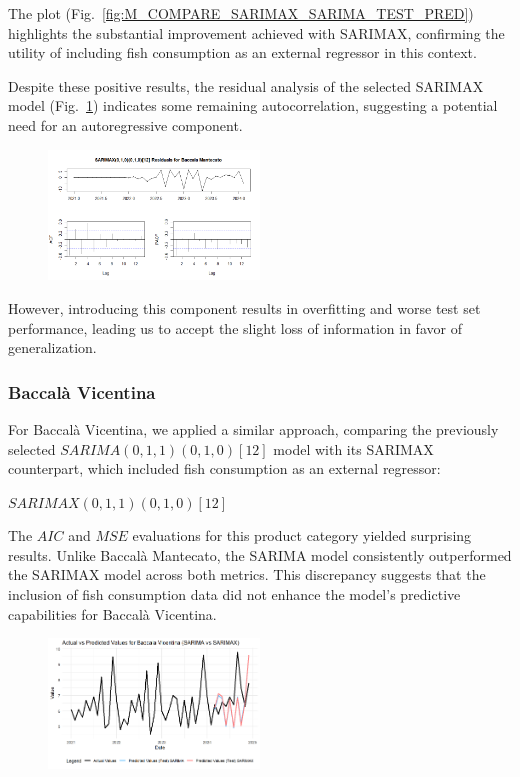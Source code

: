 \documentclass[10pt,twocolumn,letterpaper]{article}
\begin{document}
The plot (Fig.~\ref{fig:M_COMPARE_SARIMAX_SARIMA_TEST_PRED}) highlights the substantial improvement achieved with SARIMAX, confirming the utility of including fish consumption as an external regressor in this context.

Despite these positive results, the residual analysis of the selected SARIMAX model (Fig.~\ref{fig:ACF_SARIMAX_M}) indicates some remaining autocorrelation, suggesting a potential need for an autoregressive component. 
\begin{figure}[H]
    \centering
    \includegraphics[width=0.5\textwidth]{PlotsBEFD/ACF_SARIMAX_M.png} 
    \caption{}
    \label{fig:ACF_SARIMAX_M}
\end{figure}
However, introducing this component results in overfitting and worse test set performance, leading us to accept the slight loss of information in favor of generalization.

\subsubsection{Baccalà Vicentina}

For Baccalà Vicentina, we applied a similar approach, comparing the previously selected $SARIMA(0,1,1)(0,1,0)[12]$ model with its SARIMAX counterpart, which included fish consumption as an external regressor:

$SARIMAX(0,1,1)(0,1,0)[12]$

The $AIC$ and $MSE$ evaluations for this product category yielded surprising results. Unlike Baccalà Mantecato, the SARIMA model consistently outperformed the SARIMAX model across both metrics. This discrepancy suggests that the inclusion of fish consumption data did not enhance the model’s predictive capabilities for Baccalà Vicentina.

\begin{figure}[h!]
    \centering
    \includegraphics[width=0.5\textwidth]{PlotsBEFD/V_COMPARE_SARIMAX_SARIMA_TEST_PRED.png} 
    \caption{}
    \label{fig:V_COMPARE_SARIMAX_SARIMA_TEST_PRED}
\end{figure}
\end{document}
